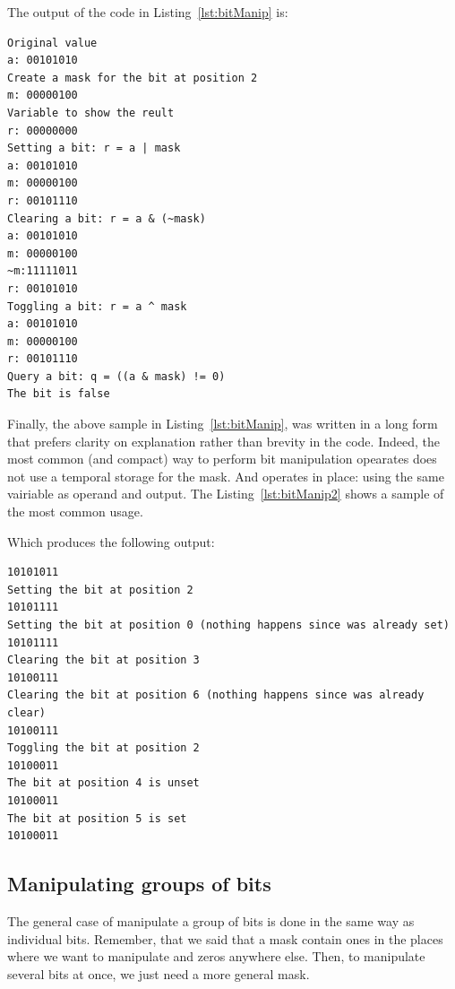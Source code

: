 The output of the code in Listing~\ref{lst:bitManip} is:
\begin{verbatim}
Original value
a: 00101010
Create a mask for the bit at position 2
m: 00000100
Variable to show the reult
r: 00000000
Setting a bit: r = a | mask
a: 00101010
m: 00000100
r: 00101110
Clearing a bit: r = a & (~mask)
a: 00101010
m: 00000100
~m:11111011
r: 00101010
Toggling a bit: r = a ^ mask
a: 00101010
m: 00000100
r: 00101110
Query a bit: q = ((a & mask) != 0)
The bit is false
\end{verbatim}

Finally, the above sample in Listing~\ref{lst:bitManip}, was written in a long form that prefers clarity on explanation rather than brevity in the code.
Indeed, the most common (and compact) way to perform bit manipulation opearates does not use a temporal storage for the mask.
And operates in place: using the same vairiable as operand and output.
The Listing~\ref{lst:bitManip2} shows a sample of the most common usage.

{\centering
\begin{minipage}{\linewidth}
\end{minipage}
\par
}

Which produces the following output:
\begin{verbatim}
10101011
Setting the bit at position 2
10101111
Setting the bit at position 0 (nothing happens since was already set)
10101111
Clearing the bit at position 3
10100111
Clearing the bit at position 6 (nothing happens since was already clear)
10100111
Toggling the bit at position 2
10100011
The bit at position 4 is unset
10100011
The bit at position 5 is set
10100011  
\end{verbatim}

\subsection{Manipulating groups of bits}

The general case of manipulate a group of bits is done in the same way as individual bits.
Remember, that we said that a mask contain ones in the places where we want to manipulate and zeros anywhere else.
Then, to manipulate several bits at once, we just need a more general mask.

